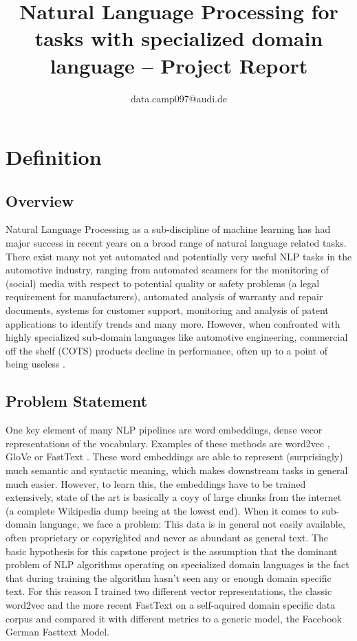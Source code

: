 \documentclass[10pt,a4paper]{article}
\begin{document}
	\title{Natural Language Processing for tasks with specialized domain language  --  Project Report}
	\author{data.camp097@audi.de}
	\maketitle
	\tableofcontents
	\section{Definition}
	
	
	\subsection{Overview}
	Natural Language Processing as a sub-discipline of machine learning has had major success in recent years on a broad range of natural language related tasks. 
	There exist many not yet automated and potentially very useful NLP tasks in the automotive industry, ranging from automated scanners for the monitoring of (social) media with respect to potential quality or safety problems (a legal requirement for manufacturers), automated analysis of warranty and repair documents, systems for customer support, monitoring and analysis of patent applications to identify trends and many more. However, when confronted with highly specialized sub-domain languages like automotive engineering, commercial off the shelf (COTS) products decline in performance, often up to a point of being useless \cite{OilandGas}. 
    

	\subsection{Problem Statement}
	
	One key element of many NLP pipelines are word embeddings, dense vecor representations of the vocabulary. Examples of these methods are word2vec \cite{word2vec}, GloVe \cite{pennington2014glove} or FastText \cite{bojanowski2017enriching}. These word embeddings are able to represent (surprisingly) much semantic and syntactic meaning, which makes downstream tasks in general much easier. However, to learn this, the embeddings have to be trained extensively, state of the art is basically a coyy of large chunks from the internet (a complete Wikipedia dump beeing at the lowest end). When it comes to sub-domain language, we face a problem: This data is in general not easily available, often proprietary or copyrighted and never as abundant as general text. The basic hypothesis for this capstone project is the assumption that the dominant problem of NLP algorithms operating on specialized domain languages is the fact that during training the algorithm hasn't seen any or enough domain specific text. For this reason I trained two different vector representations, the classic word2vec and the more recent FastText on a self-aquired domain specific data corpus and compared it with different metrics to a generic model, the Facebook German Fasttext Model.
		
\end{document}
